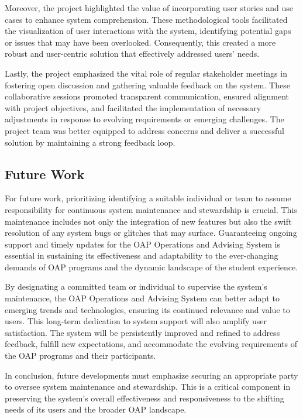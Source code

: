 \documentclass[12pt]{article}
\begin{document}
Moreover, the project highlighted the value of incorporating user stories and use cases to enhance system comprehension. These methodological tools facilitated the visualization of user interactions with the system, identifying potential gaps or issues that may have been overlooked. Consequently, this created a more robust and user-centric solution that effectively addressed users' needs.

Lastly, the project emphasized the vital role of regular stakeholder meetings in fostering open discussion and gathering valuable feedback on the system. These collaborative sessions promoted transparent communication, ensured alignment with project objectives, and facilitated the implementation of necessary adjustments in response to evolving requirements or emerging challenges. The project team was better equipped to address concerns and deliver a successful solution by maintaining a strong feedback loop.

\subsection{Future Work}
For future work, prioritizing identifying a suitable individual or team to assume responsibility for continuous system maintenance and stewardship is crucial. This maintenance includes not only the integration of new features but also the swift resolution of any system bugs or glitches that may surface. Guaranteeing ongoing support and timely updates for the OAP Operations and Advising System is essential in sustaining its effectiveness and adaptability to the ever-changing demands of OAP programs and the dynamic landscape of the student experience.

By designating a committed team or individual to supervise the system's maintenance, the OAP Operations and Advising System can better adapt to emerging trends and technologies, ensuring its continued relevance and value to users. This long-term dedication to system support will also amplify user satisfaction. The system will be persistently improved and refined to address feedback, fulfill new expectations, and accommodate the evolving requirements of the OAP programs and their participants.

In conclusion, future developments must emphasize securing an appropriate party to oversee system maintenance and stewardship. This is a critical component in preserving the system's overall effectiveness and responsiveness to the shifting needs of its users and the broader OAP landscape.
\end{document}
